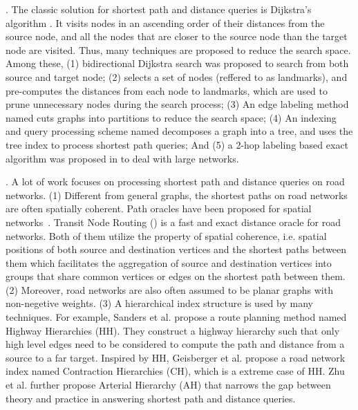 .
The classic solution for shortest path and distance queries is Dijkstra's algorithm \cite{Dijkstra59}. It visits nodes in an ascending order of their distances from the source node, and all the nodes that are closer to the source node than the target node are visited. Thus, many techniques are proposed to reduce the search space. Among these, (1) bidirectional Dijkstra search \cite{LubyR89} was proposed to search from both source and target node; (2) \alt \cite{GoldbergH05} selects a set of nodes (reffered to as landmarks), and pre-computes the distances from each node to landmarks, which are used to prune unnecessary nodes during the search process; (3) An edge labeling method named \arcflag \cite{MohringSSWW05} cuts graphs into partitions to reduce the search space;
(4) An indexing and query processing scheme named \tedi \cite{Wei10} decomposes a graph into a tree, and uses the tree index to process shortest path queries; And (5) a 2-hop labeling based exact algorithm was proposed in \cite{delling2014robust} to deal with large networks.





.
 A lot of work focuses on processing shortest path and distance queries on road networks. (1) Different from general graphs, the shortest paths on road networks are often spatially coherent. Path oracles have been proposed for spatial networks~\cite{SankaranarayananSA09}. Transit Node Routing (\tnr) \cite{arz2013transit} is a fast and exact distance oracle for road networks. Both of them utilize the property of spatial coherence, i.e. spatial positions of both source and destination vertices and the shortest paths between them which facilitates the aggregation of source and destination vertices into groups that share common vertices or edges on the shortest path between them. (2) Moreover, road networks are also often assumed to be planar graphs with non-negetive weights\cite{fakcharoenphol2006planar,gupta2004roads,klein2010shortest,MozesS12}. (3) A hierarchical index structure is used by many techniques\cite{SandersS05, GeisbergerSSD08, zhu2013shortest}. For example, Sanders et al. propose a route planning method named Highway Hierarchies (HH)\cite{SandersS05}. They construct a highway hierarchy such that only high level edges need to be considered to compute the path and distance from a source to a far target. Inspired by HH, Geisberger et al.\cite{GeisbergerSSD08} propose a road network index named Contraction Hierarchies (CH), which is a extreme case of HH. Zhu et al. further propose Arterial Hierarchy (AH)\cite{zhu2013shortest} that narrows the gap between theory and practice in answering shortest path and distance queries.

